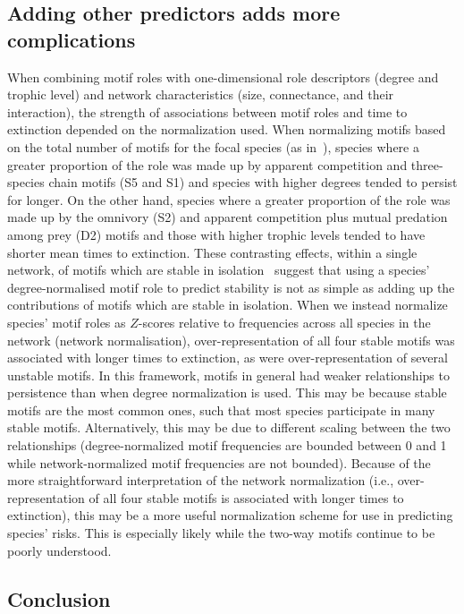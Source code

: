 \documentclass[12pt]{article}
\begin{document}
  \subsection*{Adding other predictors adds more complications}

    When combining motif roles with one-dimensional role descriptors (degree and trophic level) and network characteristics (size, connectance, and their interaction), the strength of associations between motif roles and time to extinction depended on the normalization used.
    When normalizing motifs based on the total number of motifs for the focal species (as in~\citet{Stouffer2012,Cirtwill2015}), species where a greater proportion of the role was made up by apparent competition and three-species chain motifs (S5 and S1) and species with higher degrees tended to persist for longer.
    On the other hand, species where a greater proportion of the role was made up by the omnivory (S2) and apparent competition plus mutual predation among prey (D2) motifs and those with higher trophic levels tended to have shorter mean times to extinction.
    These contrasting effects, within a single network, of motifs which are stable in isolation~\citep{Borrelli2015a} suggest that using a species' degree-normalised motif role to predict stability is not as simple as adding up the contributions of motifs which are stable in isolation.
    When we instead normalize species' motif roles as $Z$-scores relative to frequencies across all species in the network (network normalisation), over-representation of all four stable motifs was associated with longer times to extinction, as were over-representation of several unstable motifs.
    In this framework, motifs in general had weaker relationships to persistence than when degree normalization is used. 
    This may be because stable motifs are the most common ones, such that most species participate in many stable motifs.
    Alternatively, this may be due to different scaling between the two relationships (degree-normalized motif frequencies are bounded between 0 and 1 while network-normalized motif frequencies are not bounded).
    Because of the more straightforward interpretation of the network normalization (i.e., over-representation of all four stable motifs is associated with longer times to extinction), this may be a more useful normalization scheme for use in predicting species' risks.
    This is especially likely while the two-way motifs continue to be poorly understood.

  
  \subsection*{Conclusion}  
\end{document}
